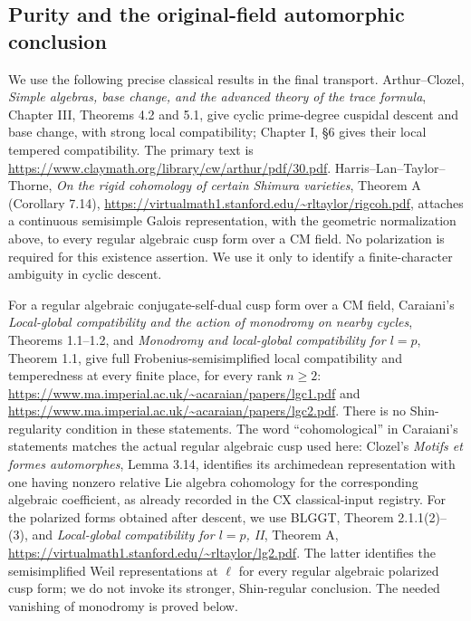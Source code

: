 \subsection{Purity and the original-field automorphic conclusion}

We use the following precise classical results in the final transport.
Arthur--Clozel, \emph{Simple algebras, base change, and the advanced
theory of the trace formula}, Chapter III, Theorems 4.2 and 5.1,
give cyclic prime-degree cuspidal descent and base change, with
strong local compatibility; Chapter I, \S6 gives their local
tempered compatibility.  The primary text is
\url{https://www.claymath.org/library/cw/arthur/pdf/30.pdf}.
Harris--Lan--Taylor--Thorne, \emph{On the rigid cohomology of
certain Shimura varieties}, Theorem A (Corollary 7.14),
\url{https://virtualmath1.stanford.edu/~rltaylor/rigcoh.pdf},
attaches a continuous semisimple Galois representation, with the
geometric normalization above, to every regular algebraic cusp
form over a CM field.  No polarization is required for this
existence assertion.  We use it only to identify a finite-character
ambiguity in cyclic descent.

For a regular algebraic conjugate-self-dual cusp form over a CM
field, Caraiani's \emph{Local-global compatibility and the action
of monodromy on nearby cycles}, Theorems 1.1--1.2, and
\emph{Monodromy and local-global compatibility for $l=p$},
Theorem 1.1, give full Frobenius-semisimplified local compatibility
and temperedness at every finite place, for every rank $n\ge2$:
\url{https://www.ma.imperial.ac.uk/~acaraian/papers/lgc1.pdf} and
\url{https://www.ma.imperial.ac.uk/~acaraian/papers/lgc2.pdf}.
There is no Shin-regularity condition in these statements.
The word ``cohomological'' in Caraiani's statements matches
the actual regular algebraic cusp used here: Clozel's
\emph{Motifs et formes automorphes}, Lemma 3.14, identifies
its archimedean representation with one having nonzero
relative Lie algebra cohomology for the corresponding
algebraic coefficient, as already recorded in the CX
classical-input registry.
For the polarized forms obtained after descent, we use
BLGGT, Theorem 2.1.1(2)--(3), and \emph{Local-global
compatibility for $l=p$, II}, Theorem A,
\url{https://virtualmath1.stanford.edu/~rltaylor/lg2.pdf}.
The latter identifies the semisimplified Weil representations
at $\ell$ for every regular algebraic polarized cusp form;
we do not invoke its stronger, Shin-regular conclusion.
The needed vanishing of monodromy is proved below.


